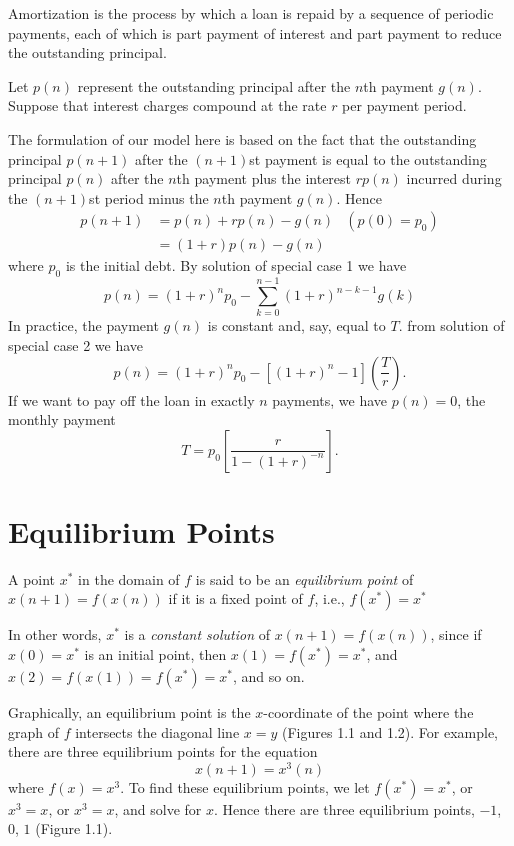 \begin{enumerate}
        Amortization is the process by which a loan is repaid by a sequence of periodic payments, each of which is part payment of interest and part payment to reduce the outstanding principal.

        Let $p(n)$ represent the outstanding principal after the $n$th payment $g(n)$. Suppose that interest charges compound at the rate $r$ per payment period.

        The formulation of our model here is based on the fact that the outstanding principal $p(n+1)$ after the $(n+1)$st payment is equal to the outstanding principal $p(n)$ after the $n$th payment plus the interest $rp(n)$ incurred during the $(n+1)$st period minus the $n$th payment $g(n)$. Hence
        \begin{align*}
            p(n+1) & =p(n)+rp(n)-g(n) & \left(p(0)=p_0\right) \\
                   & =(1+r)p(n)-g(n) &
        \end{align*}
        where $p_0$ is the initial debt. By solution of special case 1 we have
        \[p(n)=(1+r)^np_0-\sum_{k=0}^{n-1} (1+r)^{n-k-1}g(k)\]
        In practice, the payment $g(n)$ is constant and, say, equal to $T$. from solution of special case 2 we have
        \[p(n)=(1+r)^np_0-[(1+r)^n-1](\frac{T}{r}).\]
        If we want to pay off the loan in exactly $n$ payments, we have $p(n)=0$, the monthly payment
        \[T=p_0\left[\frac{r}{1-(1+r)^{-n}}\right].\]
\end{enumerate}

\section{Equilibrium Points}
\begin{definition}
    A point $x^*$ in the domain of $f$ is said to be an \textit{equilibrium point} of $x(n+1)=f(x(n))$ if it is a fixed point of $f$, i.e., $f(x^*)=x^*$
\end{definition}

In other words, $x^*$ is a \textit{constant solution} of $x(n+1)=f(x(n))$, since if $x(0)=x^*$ is an initial point, then $x(1)=f(x^*)=x^*$, and $x(2)=f(x(1))=f(x^*)=x^*$, and so on.

Graphically, an equilibrium point is the $x$-coordinate of the point where the graph of $f$ intersects the diagonal line $x=y$ (Figures 1.1 and 1.2). For example, there are three equilibrium points for the equation
\[x(n+1)=x^3(n)\]
where $f(x)=x^3$. To find these equilibrium points, we let $f(x^*)=x^*$, or $x^3=x$, or $x^3=x$, and solve for $x$. Hence there are three equilibrium points, $-1$, $0$, $1$ (Figure 1.1).

